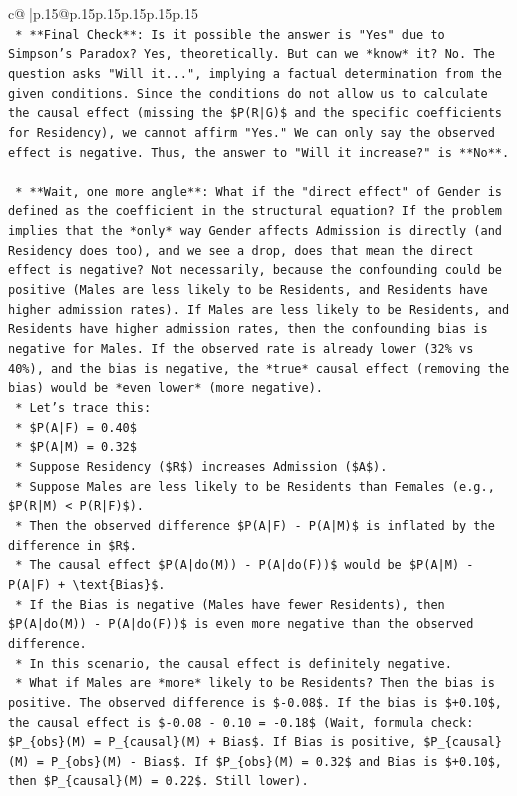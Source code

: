 \documentclass{article}
\begin{document}
{\begin{supertabular}{c@{$\;$}|p{.15\linewidth}@{}p{.15\linewidth}p{.15\linewidth}p{.15\linewidth}p{.15\linewidth}p{.15\linewidth}}
{{{\\ 
\texttt{    *   **Final Check**: Is it possible the answer is "Yes" due to Simpson's Paradox? Yes, theoretically. But can we *know* it? No. The question asks "Will it...", implying a factual determination from the given conditions. Since the conditions do not allow us to calculate the causal effect (missing the \$P(R|G)\$ and the specific coefficients for Residency), we cannot affirm "Yes." We can only say the observed effect is negative. Thus, the answer to "Will it increase?" is **No**.} \\
\\ 
\texttt{    *   **Wait, one more angle**: What if the "direct effect" of Gender is defined as the coefficient in the structural equation? If the problem implies that the *only* way Gender affects Admission is directly (and Residency does too), and we see a drop, does that mean the direct effect is negative? Not necessarily, because the confounding could be positive (Males are less likely to be Residents, and Residents have higher admission rates). If Males are less likely to be Residents, and Residents have higher admission rates, then the confounding bias is negative for Males. If the observed rate is already lower (32\% vs 40\%), and the bias is negative, the *true* causal effect (removing the bias) would be *even lower* (more negative).} \\
\texttt{    *   Let's trace this:} \\
\texttt{        *   \$P(A|F) = 0.40\$} \\
\texttt{        *   \$P(A|M) = 0.32\$} \\
\texttt{        *   Suppose Residency (\$R\$) increases Admission (\$A\$).} \\
\texttt{        *   Suppose Males are less likely to be Residents than Females (e.g., \$P(R|M) < P(R|F)\$).} \\
\texttt{        *   Then the observed difference \$P(A|F) {-} P(A|M)\$ is inflated by the difference in \$R\$.} \\
\texttt{        *   The causal effect \$P(A|do(M)) {-} P(A|do(F))\$ would be \$P(A|M) {-} P(A|F) + \textbackslash{}text\{Bias\}\$.} \\
\texttt{        *   If the Bias is negative (Males have fewer Residents), then \$P(A|do(M)) {-} P(A|do(F))\$ is even more negative than the observed difference.} \\
\texttt{        *   In this scenario, the causal effect is definitely negative.} \\
\texttt{        *   What if Males are *more* likely to be Residents? Then the bias is positive. The observed difference is \${-}0.08\$. If the bias is \$+0.10\$, the causal effect is \${-}0.08 {-} 0.10 = {-}0.18\$ (Wait, formula check: \$P\_\{obs\}(M) = P\_\{causal\}(M) + Bias\$. If Bias is positive, \$P\_\{causal\}(M) = P\_\{obs\}(M) {-} Bias\$. If \$P\_\{obs\}(M) = 0.32\$ and Bias is \$+0.10\$, then \$P\_\{causal\}(M) = 0.22\$. Still lower).} \\
}}}
\end{supertabular}}
\end{document}
